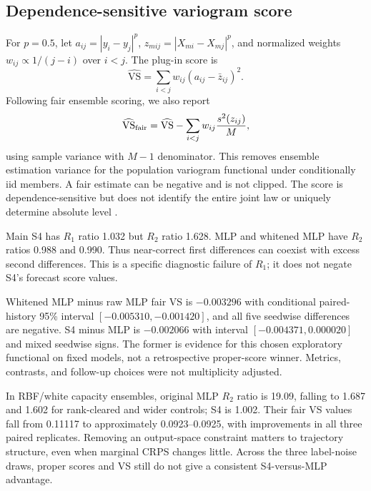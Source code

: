 \documentclass[10pt,twocolumn]{article}
\begin{document}
\subsection{Dependence-sensitive variogram score}
For $p=0.5$, let $a_{ij}=|y_i-y_j|^p$, $z_{mij}=|X_{mi}-X_{mj}|^p$, and normalized weights $w_{ij}\propto1/(j-i)$ over $i<j$. The plug-in score is
\begin{equation}
 \widehat{\mathrm{VS}}=\sum_{i<j}w_{ij}\left(a_{ij}-\bar z_{ij}\right)^2.
\end{equation}
Following fair ensemble scoring, we also report
\begin{equation}
 \widehat{\mathrm{VS}}_{\rm fair}=\widehat{\mathrm{VS}}-\sum_{i<j}w_{ij}\frac{s^2(z_{ij})}{M},
\end{equation}
using sample variance with $M-1$ denominator. This removes ensemble estimation variance for the population variogram functional under conditionally iid members. A fair estimate can be negative and is not clipped. The score is dependence-sensitive but does not identify the entire joint law or uniquely determine absolute level \cite{scheuerer,fair}.

\begin{table}[h]
\centering\footnotesize
\caption{Post-hoc main ensembles, using the 256-context cohort. All rows use identical observed targets. VS is lower-better; roughness ratios have no ordering interpretation beyond agreement with the reference moment.}\label{tab:trajectory}
\end{table}

Main S4 has $R_1$ ratio 1.032 but $R_2$ ratio 1.628. MLP and whitened MLP have $R_2$ ratios 0.988 and 0.990. Thus near-correct first differences can coexist with excess second differences. This is a specific diagnostic failure of $R_1$; it does not negate S4's forecast score values.

Whitened MLP minus raw MLP fair VS is $-0.003296$ with conditional paired-history 95\% interval $[-0.005310,-0.001420]$, and all five seedwise differences are negative. S4 minus MLP is $-0.002066$ with interval $[-0.004371,0.000020]$ and mixed seedwise signs. The former is evidence for this chosen exploratory functional on fixed models, not a retrospective proper-score winner. Metrics, contrasts, and follow-up choices were not multiplicity adjusted.

In RBF/white capacity ensembles, original MLP $R_2$ ratio is 19.09, falling to 1.687 and 1.602 for rank-cleared and wider controls; S4 is 1.002. Their fair VS values fall from 0.11117 to approximately 0.0923--0.0925, with improvements in all three paired replicates. Removing an output-space constraint matters to trajectory structure, even when marginal CRPS changes little. Across the three label-noise draws, proper scores and VS still do not give a consistent S4-versus-MLP advantage.
\end{document}
